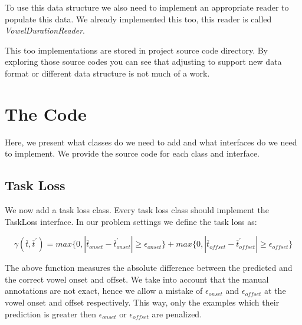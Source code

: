 \documentclass[11pt, oneside]{article}   	%
\begin{document}
To use this data structure we also need to implement an appropriate reader to populate this data. We already implemented this too, this reader is called \emph{VowelDurationReader}. 

This too implementations are stored in project source code directory. By exploring those source codes you can see that adjusting \stred to support new data format or different data structure is not much of a work.

\section{The Code}
Here, we present what classes do we need to add and what interfaces do we need to implement. We provide the source code for each class and interface.
\subsection{Task Loss}
We now add a task loss class. Every task loss class should implement the TaskLoss interface. In our problem settings we define the task loss as:

\begin{equation}
\label{eq:loss}
\gamma (\overline{t},\overline{t}^{'}) =  max\{0,|\overline{t}_{onset} -  \overline{t}^{'}_{onset}| \geq \epsilon_{onset}\} + max\{0, |\overline{t}_{offset} -  \overline{t}^{'}_{offset}| \geq \epsilon_{offset}\}
\end{equation} 

The above function measures the absolute difference between the predicted and the correct vowel onset and offset. We take into account that the manual annotations are not exact, hence we allow a mistake of $\epsilon_{onset}$ and $\epsilon_{offset}$ at the vowel onset and offset respectively. This way, only the examples which their prediction is greater then $\epsilon_{onset}$ or $\epsilon_{offset}$ are penalized.
\end{document}
